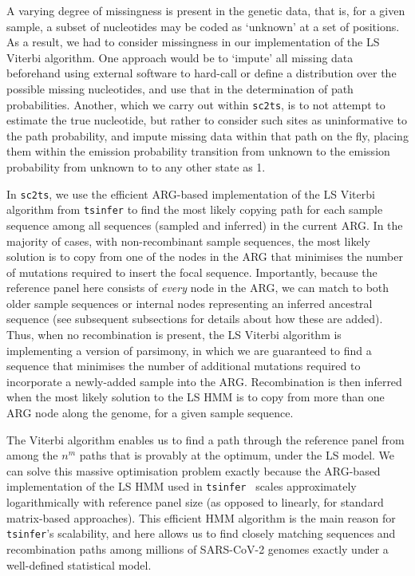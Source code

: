 \documentclass{article}
\begin{document}
A varying degree of missingness is present in the genetic data, that is, for a
given sample, a subset of nucleotides may be coded as `unknown' at a set of positions.
As a result, we had to consider missingness in our implementation of the LS
Viterbi algorithm. One approach would be to `impute' all missing data
beforehand using external software to hard-call or define a distribution over
the possible missing nucleotides, and use that in the determination of path
probabilities. Another, which we carry out within \texttt{sc2ts}, is to not attempt to estimate the true nucleotide, but
rather to consider such sites as uninformative to the path probability, and
impute missing data within that path on the fly, placing them within the emission probability transition from unknown to
the emission probability from unknown to
to any other state as 1.

In \texttt{sc2ts}, we use the efficient ARG-based implementation of the
LS Viterbi algorithm from \texttt{tsinfer} \citep{Kelleher2019-ba} to find
the most likely copying path for each sample sequence
among all sequences (sampled and inferred) in the current ARG.
In the majority of cases, with non-recombinant sample sequences,
the most likely solution is to copy from one
of the nodes in the ARG that minimises the number of mutations required
to insert the focal sequence. Importantly, because the reference panel here consists of
\emph{every} node in the ARG, we can match to both older sample
sequences or internal nodes representing an inferred ancestral sequence
(see subsequent subsections for details about how these are added).
Thus, when no recombination is present, the LS Viterbi algorithm is
implementing a version of parsimony, in which we are guaranteed to
find a sequence that minimises the number of additional mutations required
to incorporate a newly-added sample into the ARG.
Recombination is then inferred when the most likely solution to the LS
HMM is to copy from more than one ARG node along the genome, for a
given sample sequence.

The Viterbi algorithm enables us to find a path through
the reference panel from among the $n^m$ paths that is provably at the
optimum, under the LS model.
We can solve this massive optimisation problem exactly because the ARG-based
implementation of the LS HMM used in \texttt{tsinfer}~\citep{Kelleher2019-ba}
scales approximately
logarithmically with reference panel size (as opposed to linearly,
for standard matrix-based approaches).
This efficient HMM algorithm is the main reason for \texttt{tsinfer}'s
scalability, and here allows us to find closely matching
sequences and recombination paths among millions of SARS-CoV-2
genomes exactly under a well-defined statistical model.
\end{document}
